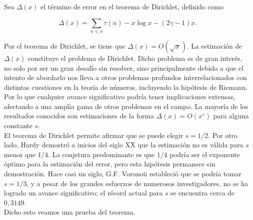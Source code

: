 Sea $\Delta(x)$ el término de error en el teorema de Dirichlet, definido como 

$$\Delta(x)=\sum_{n \leqslant x} \tau(n)-x \log x-(2 \gamma-1) x.$$


 Por el teorema de Dirichlet, se tiene que $\Delta(x)=O(\sqrt{x})$. La estimación de $\Delta(x)$ constituye el problema de Dirichlet. Dicho problema es de gran interés, no solo por ser un gran desafío sin resolver, sino principalmente debido a que el intento de abordarlo nos lleva a otros problemas profundos interrelacionados con distintas cuestiones en la teoría de números, incluyendo la hipótesis de Riemann. Por lo que cualquier avance significativo podría tener implicaciones extensas, afectando a una amplia gama de otros problemas en el campo. La mayoría de los resultados conocidos son estimaciones de la forma $\Delta(x)=O\left(x^s\right)$ para alguna constante $s$.\\


El teorema de Dirichlet permite afirmar que se puede elegir $s=1/2$. Por otro lado, Hardy demostró a inicios del siglo XX que la estimación no es válida para $s$ menor que $1/4$. La conjetura predominante es que $1/4$ podría ser el exponente óptimo para la estimación del error, pero esta hipótesis permanece sin demostración. Hace casi un siglo, G.F. Voronoii estableció que se podría tomar $s=1/3$, y a pesar de los grandes esfuerzos de numerosos investigadores, no se ha logrado un avance significativo; el récord actual para $s$ se encuentra cerca de $0,3149$.\\

Dicho esto veamos una prueba del teorema.\\

